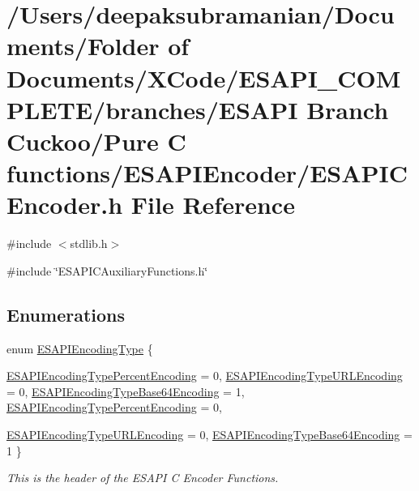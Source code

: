 \hypertarget{a00009}{
\section{/Users/deepaksubramanian/Documents/Folder of Documents/XCode/ESAPI\_\-COMPLETE/branches/ESAPI Branch Cuckoo/Pure C functions/ESAPIEncoder/ESAPICEncoder.h File Reference}
\label{da/da0/a00009}
}
{\ttfamily \#include $<$stdlib.h$>$}\par
{\ttfamily \#include \char`\"{}ESAPICAuxiliaryFunctions.h\char`\"{}}\par
\subsection*{Enumerations}
\begin{DoxyCompactItemize}
\item 
enum \hyperlink{a00009_af4b9f1c8f83fc1f697a6c6fb2ba5749c}{ESAPIEncodingType} \{ \par
\hyperlink{a00008_af4b9f1c8f83fc1f697a6c6fb2ba5749ca6b143b8248f2d6b9dc93b178c5a2df66}{ESAPIEncodingTypePercentEncoding} =  0, 
\hyperlink{a00008_af4b9f1c8f83fc1f697a6c6fb2ba5749ca061d2b58fed020025c2b059ed1d90759}{ESAPIEncodingTypeURLEncoding} =  0, 
\hyperlink{a00008_af4b9f1c8f83fc1f697a6c6fb2ba5749cab30d4a386be2c9db1ac213bca008c547}{ESAPIEncodingTypeBase64Encoding} =  1, 
\hyperlink{a00009_af4b9f1c8f83fc1f697a6c6fb2ba5749ca6b143b8248f2d6b9dc93b178c5a2df66}{ESAPIEncodingTypePercentEncoding} =  0, 
\par
\hyperlink{a00009_af4b9f1c8f83fc1f697a6c6fb2ba5749ca061d2b58fed020025c2b059ed1d90759}{ESAPIEncodingTypeURLEncoding} =  0, 
\hyperlink{a00009_af4b9f1c8f83fc1f697a6c6fb2ba5749cab30d4a386be2c9db1ac213bca008c547}{ESAPIEncodingTypeBase64Encoding} =  1
 \}
\begin{DoxyCompactList}\small\item\em This is the header of the ESAPI C Encoder Functions. \end{DoxyCompactList}\end{DoxyCompactItemize}
